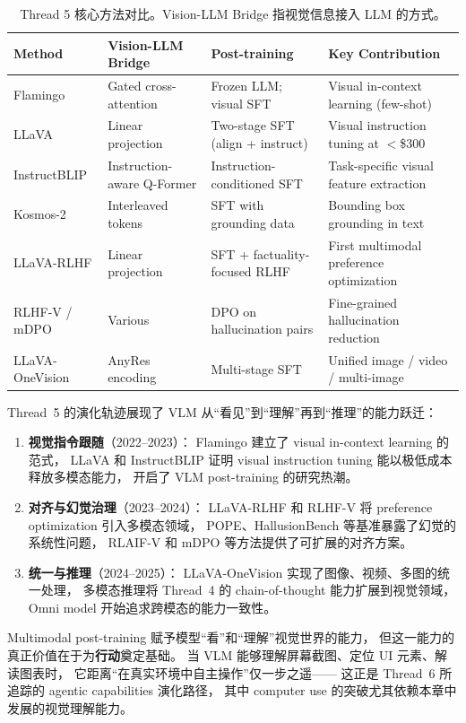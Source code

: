 \begin{table}[!ht]
\centering
\caption{Thread 5 核心方法对比。Vision-LLM Bridge 指视觉信息接入 LLM 的方式。}
\label{tab:multimodal-comparison}
\small
\begin{tabularx}{\textwidth}{l >{\raggedright\arraybackslash}p{2.5cm} >{\raggedright\arraybackslash}p{2.5cm} >{\raggedright\arraybackslash}X}
\toprule
\textbf{Method} & \textbf{Vision-LLM Bridge} & \textbf{Post-training} & \textbf{Key Contribution} \\
\midrule
Flamingo & Gated cross-attention & Frozen LLM; visual SFT & Visual in-context learning (few-shot) \\
LLaVA & Linear projection & Two-stage SFT (align + instruct) & Visual instruction tuning at $<$\$300 \\
InstructBLIP & Instruction-aware Q-Former & Instruction-conditioned SFT & Task-specific visual feature extraction \\
Kosmos-2 & Interleaved tokens & SFT with grounding data & Bounding box grounding in text \\
LLaVA-RLHF & Linear projection & SFT + factuality-focused RLHF & First multimodal preference optimization \\
RLHF-V / mDPO & Various & DPO on hallucination pairs & Fine-grained hallucination reduction \\
LLaVA-OneVision & AnyRes encoding & Multi-stage SFT & Unified image / video / multi-image \\
\bottomrule
\end{tabularx}
\end{table}

Thread~5 的演化轨迹展现了 VLM 从``看见''到``理解''再到``推理''的能力跃迁：

\begin{enumerate}[leftmargin=2em]
  \item \textbf{视觉指令跟随}（2022--2023）：
    Flamingo 建立了 visual in-context learning 的范式，
    LLaVA 和 InstructBLIP 证明 visual instruction tuning
    能以极低成本释放多模态能力，
    开启了 VLM post-training 的研究热潮。

  \item \textbf{对齐与幻觉治理}（2023--2024）：
    LLaVA-RLHF 和 RLHF-V 将 preference optimization 引入多模态领域，
    POPE、HallusionBench 等基准暴露了幻觉的系统性问题，
    RLAIF-V 和 mDPO 等方法提供了可扩展的对齐方案。

  \item \textbf{统一与推理}（2024--2025）：
    LLaVA-OneVision 实现了图像、视频、多图的统一处理，
    多模态推理将 Thread~4 的 chain-of-thought 能力扩展到视觉领域，
    Omni model 开始追求跨模态的能力一致性。
\end{enumerate}

Multimodal post-training 赋予模型``看''和``理解''视觉世界的能力，
但这一能力的真正价值在于为\textbf{行动}奠定基础。
当 VLM 能够理解屏幕截图、定位 UI 元素、解读图表时，
它距离``在真实环境中自主操作''仅一步之遥——
这正是 Thread~6 所追踪的 agentic capabilities 演化路径，
其中 computer use 的突破尤其依赖本章中发展的视觉理解能力。
